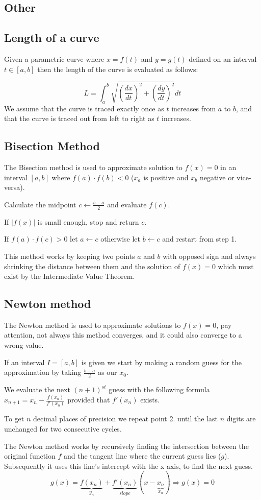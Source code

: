 \documentclass[8pt,a4paper]{extarticle}     %
\theoremstyle{definition}
\theoremstyle{definition}
\theoremstyle{definition}
\begin{document}
\begin{multicols}{4}
\section{Other}
\subsection{Length of a curve}
Given a parametric curve where $x=f(t)$ and $y=g(t)$ defined on an interval $t\in[a,b]$ then the length of the curve is evaluated as follows:

$$L = \int_a^b\sqrt{\left(\frac{dx}{dt}\right)^2 + \left(\frac{dy}{dt}\right)^2}dt$$
We assume that the curve is traced exactly once as $t$ increases from $a$ to $b$, and that the curve is traced out from left to right as $t$ increases.
\subsection{Bisection Method}
The Bisection method is used to approximate solution to $f(x)=0$ in an interval $[a,b]$ where $f(a)\cdot f(b)<0$ ($x_a$ is positive and $x_b$ negative or vice-versa).
\begin{numberlist}
	\item Calculate the midpoint $c\leftarrow\frac{b-a}{2}$ and evaluate $f(c)$.
	\item If $|f(x)|$ is small enough, stop and return $c$.
	\item If $f(a)\cdot f(c)>0$ let $a\leftarrow c$ otherwise let $b\leftarrow c$ and restart from step 1.
\end{numberlist}
This method works by keeping two points $a$ and $b$ with opposed sign and always shrinking the distance between them and the solution of $f(x) = 0$ which must exist by the Intermediate Value Theorem.

\subsection{Newton method}
The Newton method is used to approximate solutions to $f(x)=0$, pay attention, not always this method converges, and it could also converge to a wrong value.
\begin{numberlist}
	\item If an interval $I=[a,b]$ is given we start by making a random guess for the approximation by taking $\frac{b-a}{2}$ as our $x_0$.
	\item We evaluate the next $(n+1)^{st}$ guess with the following formula $x_{n+1} = x_n - \frac{f(x_n)}{f'(x_n)}$ provided that $f'(x_n)$ exists.
	\item To get $n$ decimal places of precision we repeat point 2. until the last $n$ digits are unchanged for two consecutive cycles.
\end{numberlist}
The Newton method works by recursively finding the intersection between the original function $f$ and the tangent line where the current guess lies ($g$). Subsequently it uses this line's intercept with the x axis, to find the next guess.
$$g(x) = \underbrace{f(x_n)}_{y_n} + \underbrace{f'(x_n)}_{\textit{slope}}(x-\underbrace{x_n}_{x_n}) \Rightarrow g(x) = 0$$


\end{multicols}
\end{document}
